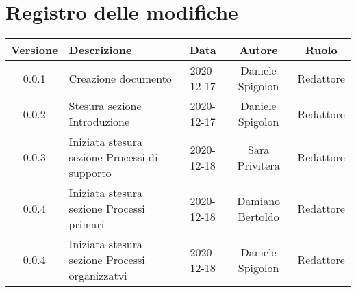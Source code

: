 \section*{Registro delle modifiche}

\begin{center}
	\begin{longtable}{|c|p{5cm}|c|c|c|}
	\hline
	\rowcolor{lighter-grayer}
	\textbf{Versione} & \textbf{Descrizione} & \textbf{Data} & \textbf{Autore} & \textbf{Ruolo} \\
	\hline
	\endfirsthead


	0.0.1 & Creazione documento & 2020-12-17 & Daniele Spigolon & Redattore \\
	\hline
	0.0.2 & Stesura sezione Introduzione & 2020-12-17 & Daniele Spigolon & Redattore \\
	\hline
	0.0.3 & Iniziata stesura sezione Processi di supporto & 2020-12-18 & Sara Privitera & Redattore \\
	\hline	
	0.0.4 & Iniziata stesura sezione Processi primari & 2020-12-18 & Damiano Bertoldo & Redattore \\
	\hline
	0.0.4 & Iniziata stesura sezione Processi organizzatvi & 2020-12-18 & Daniele Spigolon & Redattore \\
	\hline
	

	\end{longtable}
\end{center}